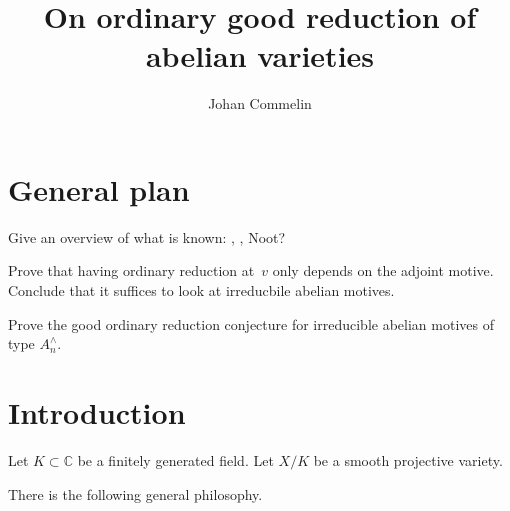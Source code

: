 \documentclass{article}
\title{On ordinary good reduction of abelian varieties}
\author{Johan Commelin}
\begin{document}
\maketitle

\section{General plan}

Give an overview of what is known:
\cite{MR1603865},
\cite{MR3494322},
Noot?

Prove that having ordinary reduction at~$v$ only depends on the adjoint motive.
Conclude that it suffices to look at irreducbile abelian motives.

Prove the good ordinary reduction conjecture
for irreducible abelian motives of type $A_n^\wedge$.

\section{Introduction}

Let $K \subset \mathbb{C}$ be a finitely generated field.
Let $X/K$ be a smooth projective variety.


There is the following general philosophy.

\printbibliography
\end{document}

